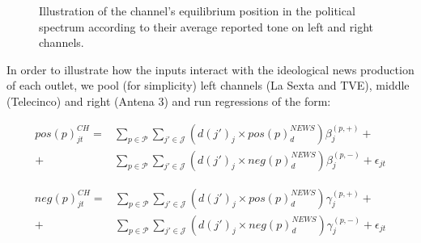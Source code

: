 \documentclass[12pt]{article}
\begin{document}
\begin{figure}
	\centering
{}
\caption{Illustration of the channel's equilibrium position in the political spectrum according to their average reported tone on left and right channels. }
\label{fig:game}
\end{figure}

In order to illustrate how the inputs interact with the ideological news production of each outlet, we pool (for simplicity) left channels (La Sexta and TVE), middle (Telecinco) and right (Antena 3) and run regressions of the form: 


\begin{equation}\label{eq:pred_pos}
	\begin{aligned}
		pos(p)^{CH}_{jt}=& \sum_{p \in \mathcal{P}} \sum_{j' \in \mathcal{J} }  \left(d(j')_j \times pos(p)^{NEWS} _d      \right) \beta_{j}^{(p,+ )}  + \\
		+ &   \sum_{p \in \mathcal{P}} \sum_{j' \in \mathcal{J} }   \left(d(j')_j \times neg(p)^{NEWS} _d      \right) \beta_{j}^{(p,- )} +\epsilon_{jt}
	\end{aligned}	
\end{equation} 



\begin{equation}\label{eq:pred_neg}
	\begin{aligned}
		neg(p)^{CH}_{jt}=& \sum_{p \in \mathcal{P}} \sum_{j'\in \mathcal{J} }    \left(d(j')_j \times pos(p)^{NEWS} _d      \right) \gamma_{j}^{(p,+ )} + \\
		+ &   \sum_{p \in \mathcal{P}} \sum_{j' \in \mathcal{J} }   \left(d(j')_j \times neg(p)^{NEWS} _d      \right) \gamma_{j}^{(p,- )} +\epsilon_{jt}
	\end{aligned}
\end{equation} 
\end{document}
